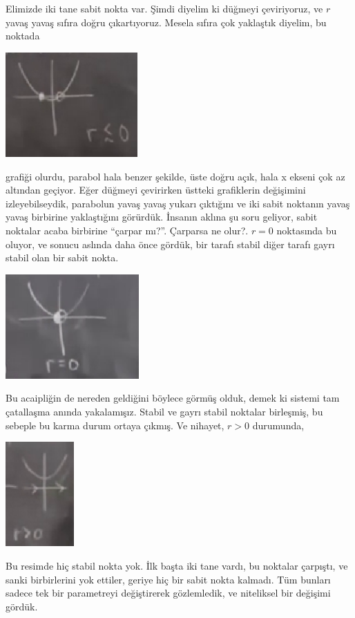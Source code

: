 \documentclass[12pt,fleqn]{article}\usepackage{../../common}
\begin{document}
Elimizde iki tane sabit nokta var. Şimdi diyelim ki düğmeyi çeviriyoruz, ve $r$
yavaş yavaş sıfıra doğru çıkartıyoruz. Mesela sıfıra çok yaklaştık diyelim, bu
noktada

\includegraphics[height=4cm]{02_11.png}

grafiği olurdu, parabol hala benzer şekilde, üste doğru açık, hala x ekseni çok
az altından geçiyor. Eğer düğmeyi çevirirken üstteki grafiklerin değişimini
izleyebilseydik, parabolun yavaş yavaş yukarı çıktığını ve iki sabit noktanın
yavaş yavaş birbirine yaklaştığını görürdük. İnsanın aklına şu soru
geliyor, sabit noktalar acaba birbirine ``çarpar mı?''. Çarparsa ne olur?. $r=0$
noktasında bu oluyor, ve sonucu aslında daha önce gördük, bir tarafı stabil
diğer tarafı gayrı stabil olan bir sabit nokta. 

\includegraphics[height=4cm]{02_12.png}

Bu acaipliğin de nereden geldiğini böylece görmüş olduk, demek ki sistemi tam
çatallaşma anında yakalamışız. Stabil ve gayrı stabil noktalar birleşmiş, bu
sebeple bu karma durum ortaya çıkmış. Ve nihayet, $r>0$ durumunda,

\includegraphics[height=4cm]{02_13.png}

Bu resimde hiç stabil nokta yok. İlk başta iki tane vardı, bu noktalar çarpıştı,
ve sanki birbirlerini yok ettiler, geriye hiç bir sabit nokta kalmadı. Tüm
bunları sadece tek bir parametreyi değiştirerek gözlemledik, ve niteliksel bir
değişimi gördük.
\end{document}
